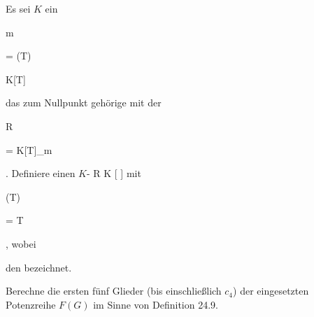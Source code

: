 {} {}



{}

{


Es sei $K$ ein


\mavergleichskette

{\vergleichskette

{ {\mathfrak m}
}

{ = }{ (T)
}

{ \subseteq }{ K[T]
}

{    }{
}

{   }{
}

}
{}{}{}
das zum Nullpunkt gehörige
mit der


\mavergleichskette

{\vergleichskette

{ R
}

{ = }{ K[T]_{\mathfrak m}
}

{  }{
}

{    }{
}

{   }{
}

}
{}{}{.}
Definiere einen
$K$-
\maabbdisp {\varphi} { R } { K [ \![ T]\! ]
} {}
mit


\mavergleichskette

{\vergleichskette

{ \varphi(T)
}

{ = }{ T
}

{  }{
}

{    }{
}

{   }{}

}
{}{}{,}
wobei

 den
bezeichnet.


}

{} {}



{}

{


Berechne die ersten fünf Glieder (bis einschließlich $c_4$) der eingesetzten Potenzreihe $F(G)$ im Sinne von
Definition 24.9.


}

{} {}





